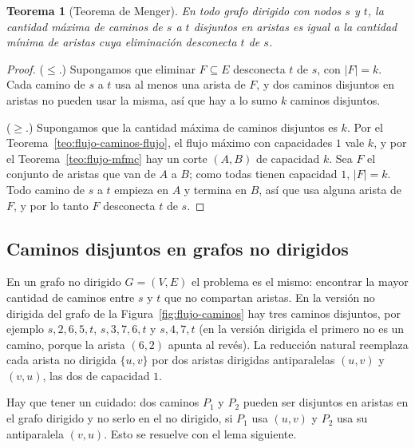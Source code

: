 \documentclass[12pt, spanish, oneside, openany]{book}
\theoremstyle{uprightplain}
\newtheorem{teorema}{Teorema}[section]
\theoremstyle{definition}
\theoremstyle{remark}
\theoremstyle{definition}
\begin{document}
\begin{teorema}[Teorema de Menger]
\label{teo:flujo-menger}
En todo grafo dirigido con nodos $s$ y $t$, la cantidad máxima de caminos de $s$ a $t$ disjuntos en aristas es igual a la cantidad mínima de aristas cuya eliminación desconecta $t$ de $s$.
\end{teorema}
\begin{proof}
($\le$.) Supongamos que eliminar $F\subseteq E$ desconecta $t$ de $s$, con $|F|=k$. Cada camino de $s$ a $t$ usa al menos una arista de $F$, y dos caminos disjuntos en aristas no pueden usar la misma, así que hay a lo sumo $k$ caminos disjuntos.

($\ge$.) Supongamos que la cantidad máxima de caminos disjuntos es $k$. Por el Teorema~\ref{teo:flujo-caminos-flujo}, el flujo máximo con capacidades $1$ vale $k$, y por el Teorema~\ref{teo:flujo-mfmc} hay un corte $(A,B)$ de capacidad $k$. Sea $F$ el conjunto de aristas que van de $A$ a $B$; como todas tienen capacidad $1$, $|F|=k$. Todo camino de $s$ a $t$ empieza en $A$ y termina en $B$, así que usa alguna arista de $F$, y por lo tanto $F$ desconecta $t$ de $s$.
\end{proof}

\subsection{Caminos disjuntos en grafos no dirigidos}

En un grafo no dirigido $G=(V,E)$ el problema es el mismo: encontrar la mayor cantidad de caminos entre $s$ y $t$ que no compartan aristas. En la versión no dirigida del grafo de la Figura~\ref{fig:flujo-caminos} hay tres caminos disjuntos, por ejemplo $s,2,6,5,t$, $s,3,7,6,t$ y $s,4,7,t$ (en la versión dirigida el primero no es un camino, porque la arista $(6,2)$ apunta al revés). La reducción natural reemplaza cada arista no dirigida $\{u,v\}$ por dos aristas dirigidas antiparalelas $(u,v)$ y $(v,u)$, las dos de capacidad $1$.

Hay que tener un cuidado: dos caminos $P_1$ y $P_2$ pueden ser disjuntos en aristas en el grafo dirigido y no serlo en el no dirigido, si $P_1$ usa $(u,v)$ y $P_2$ usa su antiparalela $(v,u)$. Esto se resuelve con el lema siguiente.
\end{document}
